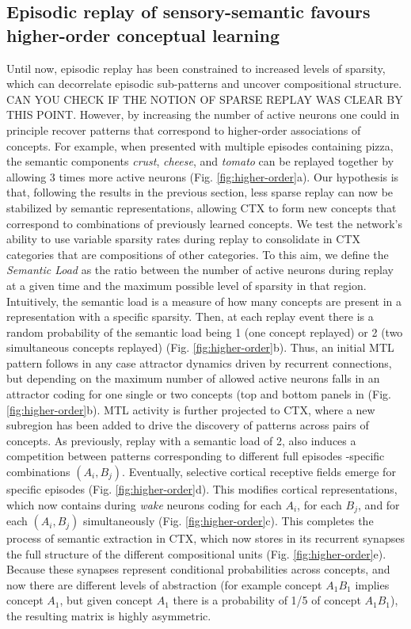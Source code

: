 \documentclass{article}
\begin{document}
\subsection*{Episodic replay of sensory-semantic favours higher-order conceptual learning}
Until now, episodic replay has been constrained to increased levels of sparsity, which can decorrelate episodic sub-patterns and uncover compositional structure. CAN YOU CHECK IF THE NOTION OF SPARSE REPLAY WAS CLEAR BY THIS POINT. However, by increasing the number of active neurons one could in principle recover patterns that correspond to higher-order associations of concepts. For example, when presented with multiple episodes containing pizza, the semantic components \textit{crust}, \textit{cheese}, and \textit{tomato} can be replayed together by allowing 3 times more active neurons (Fig. \ref{fig:higher-order}a). Our hypothesis is that, following the results in the previous section, less sparse replay can now be stabilized by semantic representations, allowing CTX to form new concepts that correspond to combinations of previously learned concepts.
\newline\newline
We test the network's ability to use variable sparsity rates during replay to consolidate in CTX categories that are compositions of other categories. To this aim, we define the \textit{Semantic Load} as the ratio between the number of active neurons during replay at a given time and the maximum possible level of sparsity in that region. Intuitively, the semantic load is a measure of how many concepts are present in a representation with a specific sparsity. Then, at each replay event there is a random probability of the semantic load being 1 (one concept replayed) or 2 (two simultaneous concepts replayed) (Fig. \ref{fig:higher-order}b). Thus, an initial MTL pattern follows in any case attractor dynamics driven by recurrent connections, but depending on the maximum number of allowed active neurons falls in an attractor coding for one single or two concepts (top and bottom panels in (Fig. \ref{fig:higher-order}b). MTL activity is further projected to CTX, where a new subregion has been added to drive the discovery of patterns across pairs of concepts.
\newline\newline
As previously, replay with a semantic load of 2, also induces a competition between patterns corresponding to different full episodes -specific combinations $(A_i, B_j)$. Eventually, selective cortical receptive fields emerge for specific episodes (Fig. \ref{fig:higher-order}d). This modifies cortical representations, which now contains during \textit{wake} neurons coding for each $A_i$, for each $B_j$, and for each $(A_i, B_j)$ simultaneously (Fig. \ref{fig:higher-order}c). This completes the process of semantic extraction in CTX, which now stores in its recurrent synapses the full structure of the different compositional units (Fig. \ref{fig:higher-order}e). Because these synapses represent conditional probabilities across concepts, and now there are different levels of abstraction (for example concept $A_1B_1$ implies concept $A_1$, but given concept $A_1$ there is a probability of 1/5 of concept $A_1B_1$), the resulting matrix is highly asymmetric.
\end{document}

